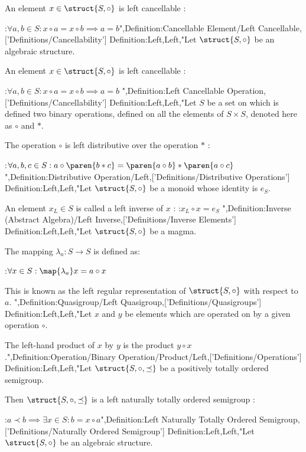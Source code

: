 An element $x \in \struct {S, \circ}$ is left cancellable :

:$\forall a, b \in S: x \circ a = x \circ b \implies a = b$",Definition:Cancellable Element/Left Cancellable,['Definitions/Cancellability']
Definition:Left,Left,"Let $\struct {S, \circ}$ be an algebraic structure.


An element $x \in \struct {S, \circ}$ is left cancellable :

:$\forall a, b \in S: x \circ a = x \circ b \implies a = b$
",Definition:Left Cancellable Operation,['Definitions/Cancellability']
Definition:Left,Left,"Let $S$ be a set on which is defined two binary operations, defined on all the elements of $S \times S$, denoted here as $\circ$ and $*$.

The operation $\circ$ is left distributive over the operation $*$ :

:$\forall a, b, c \in S: a \circ \paren {b * c} = \paren {a \circ b} * \paren {a \circ c}$",Definition:Distributive Operation/Left,['Definitions/Distributive Operations']
Definition:Left,Left,"Let $\struct {S, \circ}$ be a monoid whose identity is $e_S$.

An element $x_L \in S$ is called a left inverse of $x$ :
:$x_L \circ x = e_S$
",Definition:Inverse (Abstract Algebra)/Left Inverse,['Definitions/Inverse Elements']
Definition:Left,Left,"Let $\struct {S, \circ}$ be a magma.

The mapping $\lambda_a: S \to S$ is defined as:

:$\forall x \in S: \map {\lambda_a} x = a \circ x$


This is known as the left regular representation of $\struct {S, \circ}$ with respect to $a$.
",Definition:Quasigroup/Left Quasigroup,['Definitions/Quasigroups']
Definition:Left,Left,"Let $x$ and $y$ be elements which are operated on by a given operation $\circ$.

The left-hand product of $x$ by $y$ is the product $y \circ x$.",Definition:Operation/Binary Operation/Product/Left,['Definitions/Operations']
Definition:Left,Left,"Let $\struct {S, \circ, \preceq}$ be a positively totally ordered semigroup.


Then $\struct {S, \circ, \preceq}$ is a left naturally totally ordered semigroup :

:$a \prec b \implies \exists x \in S: b = x \circ a$",Definition:Left Naturally Totally Ordered Semigroup,['Definitions/Naturally Ordered Semigroup']
Definition:Left,Left,"Let $\struct {S, \circ}$ be an algebraic structure.

